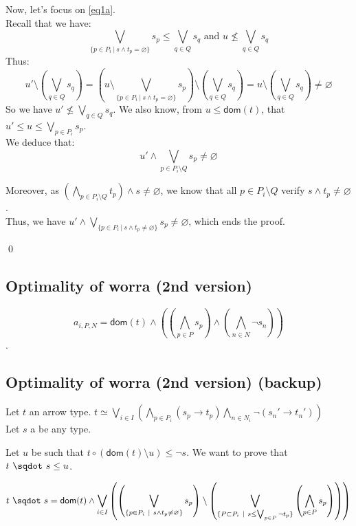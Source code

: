 \documentclass[a4paper]{article}%
\newcommand{\worra}[2]{#1\mathop{\,\sqdot\,} #2}
\newcommand{\apply}[2]{#1\circ#2}
\newcommand{\dom}[1]{\textsf{dom}(#1)}
\newcommand{\alt}{~|~}
\begin{document}
    Now, let's focus on \cref{eq1a}.\\
    Recall that we have:
    \[ \bigvee_{\{p \in P_i \alt s \land t_p = \varnothing\}}s_p \leq \bigvee_{q \in Q}s_q 
    \text{\ \ \ and\ \ \ } u \not\leq\bigvee_{q\in Q}s_q \]
    Thus:
    \[ u' \setminus \left(\bigvee_{q \in Q}s_q\right) = \left(u \setminus \bigvee_{\{p \in P_i \alt s \land t_p = \varnothing\}}s_p\right) \setminus \left(\bigvee_{q \in Q}s_q\right) = u \setminus \left(\bigvee_{q \in Q}s_q\right) \neq \varnothing \]
    So we have $ u' \not\leq\bigvee_{q\in Q}s_q $. We also know, from $u \leq \dom t$, that $u' \leq u \leq \bigvee_{p\in P_i}s_p$.\\

    We deduce that:
    \[ u' \land \bigvee_{p\in P_i \setminus Q}s_p \neq \varnothing \]

    Moreover, as $(\bigwedge_{p\in P_i\setminus Q}t_p) \land s \neq \varnothing$, we know that all $p \in P_i \setminus Q$ verify $s \land t_p \neq \varnothing$.\\
    Thus, we have $u' \land \bigvee_{\{p\in P_i\alt s\wedge t_p\not=\varnothing\}}s_p \neq \varnothing$, which ends the proof.
    
    \qed

    \pagebreak

    \subsection{Optimality of worra (2nd version)}

    \[a_{i,P,N}=\dom t \land \left(\left(\bigwedge_{p\in P} s_p\right) \land \left(\bigwedge_{n \in N} \neg s_n\right) \right)\].\\

    \pagebreak

    \subsection{Optimality of worra (2nd version) (backup)}

    Let $t$ an arrow type. $t \simeq \bigvee_{i\in I}\left(\bigwedge_{p\in P_i}(s_p\to t_p)\bigwedge_{n\in N_i}\neg(s_n'\to t_n')\right)$\\
    Let $s$ a be any type.

    Let $u$ be such that $\apply t {(\dom t \setminus u)} \leq \neg s$. We want to prove that $\worra t s \leq u$.

    \[\worra t s = \dom t \wedge\bigvee_{i\in I}\left(\left(\bigvee_{\{p\in P_i\alt s\wedge t_p\not=\varnothing\}}s_p\right) \setminus \left(\bigvee_{\{P \subset P_i\alt s \leq \bigvee_{p \in P} \neg t_p\}} \left(\bigwedge_{p \in P} s_p\right) \right)\right)\]
\end{document}
